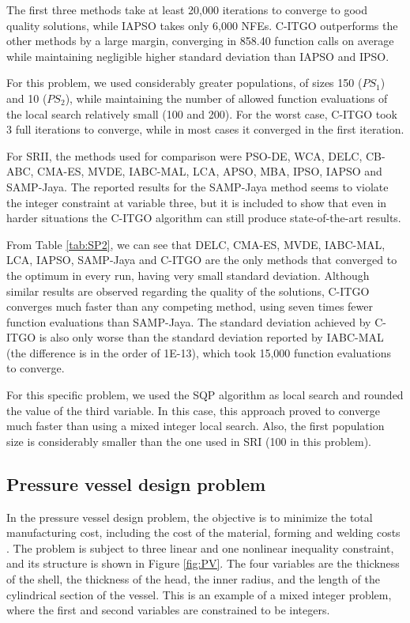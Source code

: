 

The first three methods take at least 20,000 iterations to converge to good quality solutions, while IAPSO takes only 6,000 NFEs. C-ITGO outperforms the other methods by a large margin, converging in 858.40 function calls on average while maintaining negligible higher standard deviation than IAPSO and IPSO.

For this problem, we used considerably greater populations, of sizes 150 ($PS_1$) and 10 ($PS_2$), while maintaining the number of allowed function evaluations of the local search relatively small (100 and 200). For the worst case, C-ITGO took 3 full iterations to converge, while in most cases it converged in the first iteration.

For SRII, the methods used for comparison were PSO-DE, WCA, DELC, CB-ABC, CMA-ES, MVDE, IABC-MAL, LCA, APSO, MBA, IPSO, IAPSO and SAMP-Jaya. The reported results for the SAMP-Jaya method seems to violate the integer constraint at variable three, but it is included to show that even in harder situations the C-ITGO algorithm can still produce state-of-the-art results.

From Table \ref{tab:SP2}, we can see that DELC, CMA-ES, MVDE, IABC-MAL, LCA, IAPSO, SAMP-Jaya and C-ITGO are the only methods that converged to the optimum in every run, having very small standard deviation. Although similar results are observed regarding the quality of the solutions, C-ITGO converges much faster than any competing method, using seven times fewer function evaluations than SAMP-Jaya. The standard deviation achieved by C-ITGO is also only worse than the standard deviation reported by IABC-MAL (the difference is in the order of 1E-13), which took 15,000 function evaluations to converge.



For this specific problem, we used the SQP algorithm as local search and rounded the value of the third variable. In this case, this approach proved to converge much faster than using a mixed integer local search. Also, the first population size is considerably smaller than the one used in SRI (100 in this problem).



\subsection{Pressure vessel design problem}

In the pressure vessel design problem, the objective is to minimize the total manufacturing cost, including the cost of the material, forming and welding costs \citep{PV}. The problem is subject to three linear and one nonlinear inequality constraint, and its structure is shown in Figure \ref{fig:PV}. The four variables are the thickness of the shell, the thickness of the head, the inner radius, and the length of the cylindrical section of the vessel. This is an example of a mixed integer problem, where the first and second variables are constrained to be integers.


